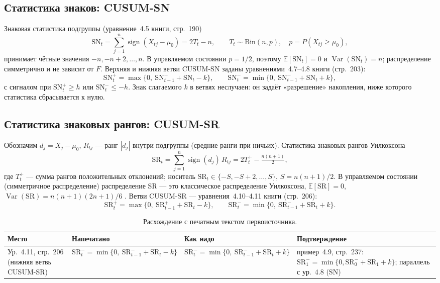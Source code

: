 \documentclass[11pt,a4paper]{article}
\newcommand{\SN}{\mathrm{SN}}
\newcommand{\SR}{\mathrm{SR}}
\newcommand{\E}{\mathbb{E}}
\begin{document}
\subsection{Статистика знаков: CUSUM-SN}
\label{sec:math-sn}

Знаковая статистика подгруппы (уравнение~4.5 книги, стр.~190)
\begin{equation}
\SN_t = \sum_{j=1}^{n} \operatorname{sign}(X_{tj}-\mu_0) = 2T_t - n,
\qquad T_t \sim \mathrm{Bin}(n,p),\quad p = P(X_{tj} \ge \mu_0),
\label{eq:sn}
\end{equation}
принимает чётные значения $-n, -n+2, \dots, n$. В управляемом состоянии
$p = 1/2$, поэтому $\E[\SN_t]=0$ и $\operatorname{Var}(\SN_t)=n$;
распределение симметрично и не зависит от $F$. Верхняя и нижняя ветви
CUSUM-SN заданы уравнениями~4.7--4.8 книги (стр.~203):
\begin{equation}
\SN_t^+ = \max\{0,\ \SN_{t-1}^+ + \SN_t - k\},\qquad
\SN_t^- = \min\{0,\ \SN_{t-1}^- + \SN_t + k\},
\label{eq:sn-cusum}
\end{equation}
с сигналом при $\SN_t^+ \ge h$ или $\SN_t^- \le -h$. Знак слагаемого $k$
в ветвях неслучаен: он задаёт «разрешение» накопления, ниже которого
статистика сбрасывается к нулю.

\subsection{Статистика знаковых рангов: CUSUM-SR}
\label{sec:math-sr}

Обозначим $d_j = X_j - \mu_0$, $R_{tj}$ --- ранг $|d_j|$ внутри подгруппы
(средние ранги при ничьих). Статистика знаковых рангов Уилкоксона
\begin{equation}
\SR_t = \sum_{j=1}^{n} \operatorname{sign}(d_j)\, R_{tj}
      = 2T_t^+ - \tfrac{n(n+1)}{2},
\label{eq:sr}
\end{equation}
где $T_t^+$ --- сумма рангов положительных отклонений; носитель
$\SR_t \in \{-S, -S+2, \dots, S\}$, $S = n(n+1)/2$. В управляемом
состоянии (симметричное распределение) распределение $\SR$ --- это
классическое распределение Уилкоксона, $\E[\SR]=0$,
$\operatorname{Var}(\SR)=n(n+1)(2n+1)/6$
\cite[табл.~4.3, стр.~200]{Chakraborti2019}. Ветви CUSUM-SR ---
уравнения~4.10--4.11 книги (стр.~206):
\begin{equation}
\SR_t^+ = \max\{0,\ \SR_{t-1}^+ + \SR_t - k\},\qquad
\SR_t^- = \min\{0,\ \SR_{t-1}^- + \SR_t + k\}.
\label{eq:sr-cusum}
\end{equation}

\begin{table}[htbp]\centering
\caption{Расхождение с печатным текстом первоисточника.}
\label{tab:typo}
\small
\begin{tabular}{@{}p{3.2cm} p{4.4cm} p{3.0cm} p{4.2cm}@{}}
\toprule
Место & Напечатано & Как надо & Подтверждение \\
\midrule
Ур.~4.11, стр.~206 (нижняя ветвь CUSUM-SR) &
$\SR_t^- = \min\{0,\ \SR_{t-1}^- + \SR_t - k\}$ &
$\SR_t^- = \min\{0,\ \SR_{t-1}^- + \SR_t + k\}$ &
пример~4.9, стр.~237: $\SR_1^- = \min\{0,\SR_0^- + \SR_1 + k\}$;
параллель с ур.~4.8 ($\SN$) \\
\bottomrule
\end{tabular}
\normalsize
\end{table}
\end{document}
